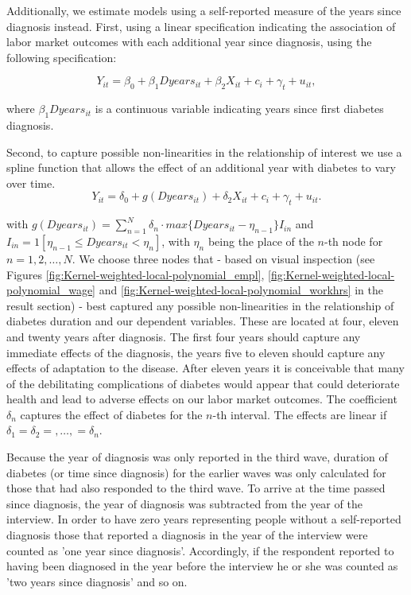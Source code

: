 \documentclass[12pt,english,british]{article}
\begin{document}
Additionally, we estimate models using a self-reported
measure of the years since diagnosis instead. First, using a linear specification
indicating the association of labor market  outcomes with each additional
year since diagnosis, using the following specification:

\begin{equation}
Y_{it}=\beta_{0}+\beta_{1}Dyears_{it}+\beta_{2}X_{it}+c_{i}+\gamma_{t}+u_{it},\label{eq:duration_linear}
\end{equation}


\noindent where $\beta_{1}Dyears_{it}$ is a continuous variable indicating
years since first diabetes diagnosis.

Second, to capture possible non-linearities in the relationship of interest we use a spline function that allows the effect
of an additional year with diabetes to vary over time.
\begin{equation}
Y_{it}=\delta_{0}+g(Dyears_{it})+\delta_{2}X_{it}+c_{i}+\gamma_{t}+u_{it}.\label{eq:splines}
\end{equation}


\noindent with $g(Dyears_{it})=\sum_{n=1}^{N}\delta_{n}\cdot max\{Dyears_{it}-\eta_{n-1}\}I_{in}$
and $I_{in}=1[\eta_{n-1}\leq Dyears_{it}<\eta_{n}]$, with $\eta_{n}$
being the place of the $n$-th node for $n=1,2,\ldots,N$. We choose
three nodes that - based on visual inspection (see Figures \ref{fig:Kernel-weighted-local-polynomial_empl}, \ref{fig:Kernel-weighted-local-polynomial_wage} and \ref{fig:Kernel-weighted-local-polynomial_workhrs} in the
result section) - best captured any possible non-linearities in the
relationship of diabetes duration and our dependent variables. These
are located at four, eleven and twenty years after diagnosis. The
first four years should capture any immediate effects of the diagnosis,
the years five to eleven should capture any effects of adaptation to
the disease. After eleven years it is conceivable that many of the
debilitating complications of diabetes would appear that could deteriorate
health and lead to adverse effects on our labor market outcomes.
The coefficient$\delta_{n}$ captures the effect of diabetes for the
$n$-th interval. The effects are linear if $\delta_{1}=\delta_{2}=,\ldots,=\delta_{n}$.

Because the year of diagnosis was only reported in the third wave,
duration of diabetes (or time since diagnosis)
for the earlier waves was only calculated for those that had also responded to the third
wave. To arrive at the time passed since diagnosis, the year of diagnosis
was subtracted from the year of the interview. In order to have zero years representing people without a self-reported  diagnosis those that reported
a diagnosis in the year of the interview were counted as 'one year
since diagnosis'. Accordingly, if the respondent reported to having
been diagnosed in the year before the interview he or she was counted
as 'two years since diagnosis' and so on.
\end{document}
